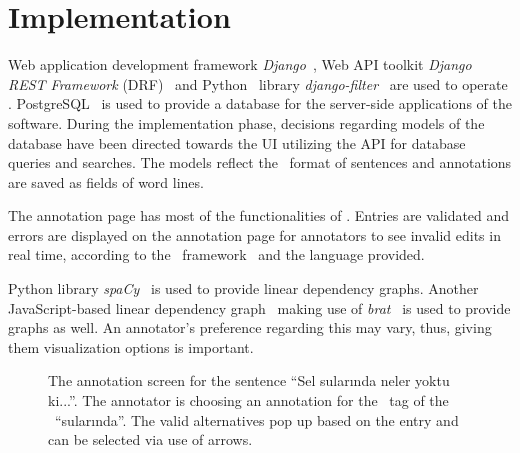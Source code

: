 \section{Implementation}
\label{sec:implementation}

Web application development framework \textit{Django}~\cite{django}, Web API toolkit \textit{Django REST Framework} (DRF)~\cite{drf} and Python~\cite{python} library \textit{django-filter}~\cite{django-filter} are used to operate \boatvtwo.
PostgreSQL~\cite{psql} is used to provide a database for the server-side applications of the software.
During the implementation phase, decisions regarding models of the database have been directed towards the UI utilizing the API for database queries and searches.
The models reflect the \ud\ format of sentences and annotations are saved as fields of word lines.

The annotation page has most of the functionalities of \boatvone.
Entries are validated and errors are displayed on the annotation page for annotators to see invalid edits in real time, according to the \ud\ framework~\cite{UD-git} and the language provided.

Python library \textit{spa\textsc{C}y}~\cite{spacy} is used to provide linear dependency graphs.
Another JavaScript-based linear dependency graph~\cite{spyssalo} making use of \textit{brat}~\cite{brat-vis} is used to provide graphs as well.
An annotator's preference regarding this may vary, thus, giving them visualization options is important.

\begin{figure}[tbh]
    \centering
    \caption{The annotation screen for the sentence ``Sel sularında neler yoktu ki...''.
        The annotator is choosing an annotation for the \deprel\ tag of the \form\ ``sularında''.
        The valid alternatives pop up based on the entry and can be selected via use of arrows. }
    \label{fig:anno-fig}
\end{figure}

